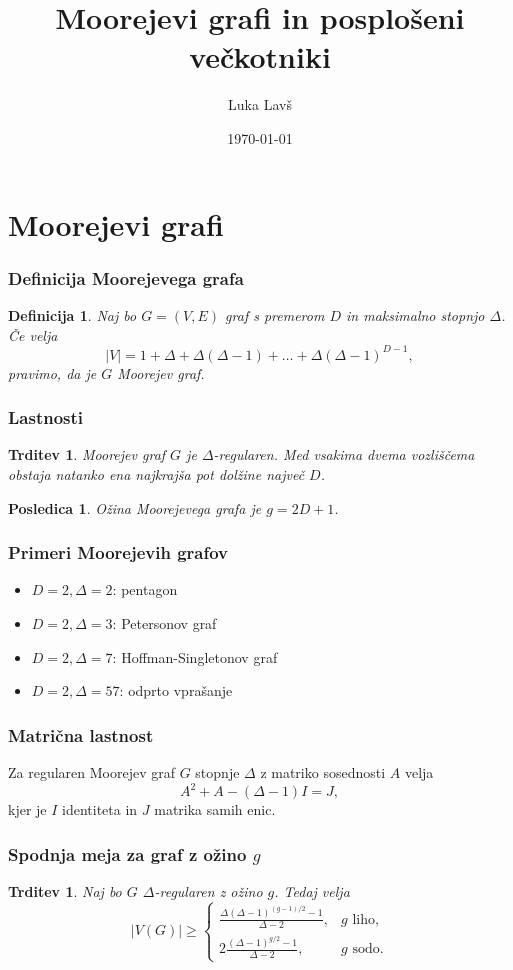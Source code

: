 \documentclass{beamer}
\title{Moorejevi grafi in posplošeni večkotniki}
\author{Luka Lavš}
\date{\today}
\newtheorem{trditev}[izrek]{Trditev}
\newtheorem{posledica}[izrek]{Posledica}
\newtheorem{definicija}[izrek]{Definicija}
\begin{document}
\begin{frame}
    \titlepage
\end{frame}

\section{Moorejevi grafi}

\begin{frame}
\frametitle{Definicija Moorejevega grafa}
\begin{definicija}
Naj bo $G=(V,E)$ graf s premerom $D$ in maksimalno stopnjo $\Delta$.  
Če velja
\[
|V| = 1 + \Delta + \Delta(\Delta-1) + \dots + \Delta(\Delta-1)^{D-1},
\]
pravimo, da je $G$ \emph{Moorejev graf}.
\end{definicija}
\end{frame}

\begin{frame}
\frametitle{Lastnosti}
\begin{trditev}
Moorejev graf $G$ je $\Delta$-regularen. Med vsakima dvema vozliščema obstaja natanko ena najkrajša pot dolžine največ $D$.
\end{trditev}

\begin{posledica}
Ožina Moorejevega grafa je $g = 2D + 1$.
\end{posledica}
\end{frame}

\begin{frame}
\frametitle{Primeri Moorejevih grafov}
\begin{itemize}
    \item $D=2, \Delta=2$: pentagon
    \item $D=2, \Delta=3$: Petersonov graf
    \item $D=2, \Delta=7$: Hoffman-Singletonov graf
    \item $D=2, \Delta=57$: odprto vprašanje
\end{itemize}
\end{frame}

\begin{frame}
\frametitle{Matrična lastnost}
Za regularen Moorejev graf $G$ stopnje $\Delta$ z matriko sosednosti $A$ velja
\[
A^2 + A - (\Delta-1)I = J,
\]
kjer je $I$ identiteta in $J$ matrika samih enic.
\end{frame}

\begin{frame}
\frametitle{Spodnja meja za graf z ožino $g$}
\begin{trditev}
Naj bo $G$ $\Delta$-regularen z ožino $g$. Tedaj velja
\[
|V(G)| \ge
\begin{cases}
\frac{\Delta(\Delta-1)^{(g-1)/2}-1}{\Delta-2}, & g \text{ liho},\\[1em]
2\frac{(\Delta-1)^{g/2}-1}{\Delta-2}, & g \text{ sodo}.
\end{cases}
\]
\end{trditev}
\end{frame}
\end{document}
